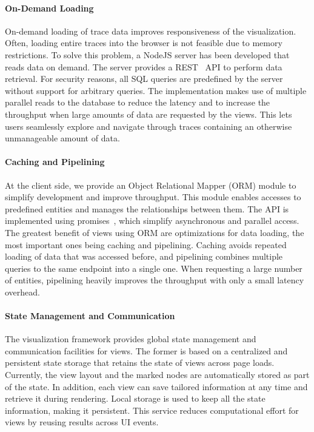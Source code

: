 \paragraph{On-Demand Loading}
On-demand loading of trace data improves responsiveness of the visualization.
Often, loading entire traces into the browser is not feasible due to memory
restrictions. To solve this problem, a NodeJS server has been developed that
reads data on demand. The server provides a REST~\cite{rest} API to perform
data retrieval. For security reasons, all SQL queries are predefined by the
server without support for arbitrary queries. The implementation makes use of
multiple parallel reads to the database to reduce the latency and to increase
the throughput when large amounts of data are requested by the views. This lets
users seamlessly explore and navigate through traces containing an otherwise
unmanageable amount of data.

\paragraph{Caching and Pipelining}
At the client side, we provide an Object Relational Mapper (ORM) module to
simplify development and improve throughput. This module enables accesses
to predefined entities and manages the relationships between them. The API is
implemented using promises~\cite{promises}, which simplify asynchronous and
parallel access. The greatest benefit of views using ORM are optimizations
for data loading, the most important ones being caching and pipelining. Caching
avoids repeated loading of data that was accessed before, and pipelining
combines multiple queries to the same endpoint into a single one. When
requesting a large number of entities, pipelining heavily improves the
throughput with only a small latency overhead.

\paragraph{State Management and Communication}
The visualization framework provides global state management and communication
facilities for views. The former is based on a centralized and persistent state
storage that retains the state of views across page loads. Currently,
the view layout and the marked nodes are automatically stored as part of the
state. In addition, each view can save tailored information at any time and
retrieve it during rendering. Local storage is used to keep all the state
information, making it persistent. This service reduces computational effort
for views by reusing results across UI events.

